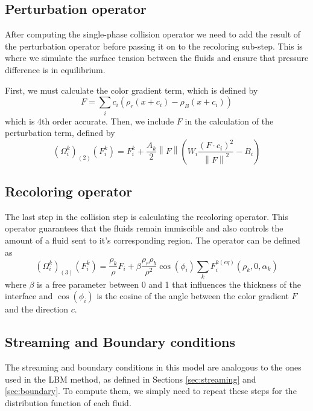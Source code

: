 \documentclass[12pt, openany]{book}
\newcommand{\norm}[1]{\left\lVert#1\right\rVert}
\begin{document}
\subsection{Perturbation operator}
After computing the single-phase collision operator we need to add the result of the perturbation operator before passing it on to the recoloring sub-step. This is where we simulate the surface tension between the fluids and ensure that pressure difference is in equilibrium.\par
First, we must calculate the color gradient term, which is defined by
\begin{equation}\label{eq:colorGrad}
F = \sum_i c_i \left(\rho_r\left(x+c_i\right) - \rho_B\left(x+c_i\right)\right)
\end{equation}
which is 4th order accurate. Then, we include $F$ in the calculation of the perturbation term, defined by
\begin{equation}\label{eq:pert}
\left(\Omega_i^{k}\right)_{\left(2\right)}\left(F_i^k\right) = F_i^k + \frac{A_k}{2}\norm{F}\left(W_i\frac{\left(F\cdot c_i\right)^2}{\norm{F}^2} - B_i\right)
\end{equation}
\subsection{Recoloring operator}
The last step in the collision step is calculating the recoloring operator. This operator guarantees that the fluids remain immiscible and also controls the amount of a fluid sent to it's corresponding region. The operator can be defined as
\begin{equation}
\left(\Omega_i^{k}\right)_{\left(3\right)}\left(F_i^k\right) = \frac{\rho_k}{\rho}F_i + \beta\frac{\rho_r \rho_b}{\rho^2}\cos \left(\phi_i\right)\sum_k F_i^{k\left(eq\right)}\left(\rho_k,0,\alpha_k\right)
\end{equation}
where $\beta$ is a free parameter between 0 and 1 that influences the thickness of the interface and $\cos \left(\phi_i\right)$ is the cosine of the angle between the color gradient $F$ and the direction $c$.
\subsection{Streaming and Boundary conditions}
The streaming and boundary conditions in this model are analogous to the ones used in the LBM method, as defined in Sections \ref{sec:streaming} and \ref{sec:boundary}. To compute them, we simply need to repeat these steps for the distribution function of each fluid.
\end{document}
